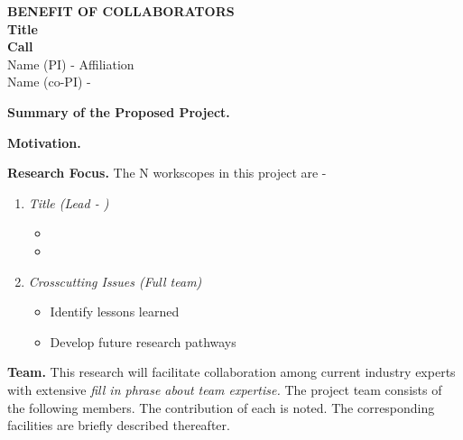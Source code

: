 \documentclass[11pt,letterpaper]{article}
\begin{document}
{\centering 
    \textbf{BENEFIT OF COLLABORATORS\\
    Title\\
    Call\\
    }
    Name (PI) - Affiliation\\
    Name (co-PI) - 
\par
}

\vspace{0.5\baselineskip}

\noindent\textbf{Summary of the Proposed Project.} 

\vspace{0.5\baselineskip}

\noindent\textbf{Motivation.} 

\vspace{0.5\baselineskip}

\noindent\textbf{Research Focus.} The N workscopes in this project are - 
\begin{enumerate}[topsep=0pt,itemsep=-1ex,partopsep=1ex,parsep=1ex]
    \item\textit{Title (Lead - )}
        \begin{itemize}[topsep=-1ex,itemsep=-1ex,partopsep=1ex,parsep=1ex]
            \item 
            \item 
        \end{itemize}
    \item\textit{Crosscutting Issues (Full team)}
        \begin{itemize}[topsep=-1ex,itemsep=-1ex,partopsep=1ex,parsep=1ex]
            \item Identify lessons learned
            \item Develop future research pathways
        \end{itemize}
\end{enumerate}

\vspace{0.5\baselineskip}

\vspace{\baselineskip}

\noindent\textbf{Team.} This research will facilitate collaboration among current industry experts with extensive \textit{fill in phrase about team expertise.} The project team consists of the following members. The contribution of each is noted. The corresponding facilities are briefly described thereafter.

\vspace{0.5\baselineskip}
\end{document}
